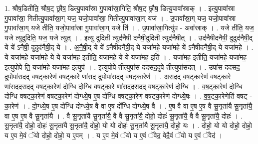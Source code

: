\documentclass[17pt]{extarticle}
\begin{document}
1. श्रौष॒डितीति॒ श्रौष॒ट् छ्रौष॒ डित्यु॒पावा᳚स्रा गु॒पावा᳚स्रा॒गिति॒ श्रौष॒ट् छ्रौष॒ डित्यु॒पावा᳚स्राक् । . इत्यु॒पावा᳚स्रा गु॒पावा᳚स्रा॒ गितीत्यु॒पावा᳚स्रा॒ग् यज॒ यजो॒पावा᳚स्रा॒ गितीत्यु॒पावा᳚स्रा॒ग् यज॑ । . उ॒पावा᳚स्रा॒ग् यज॒ यजो॒पावा᳚स्रा गु॒पावा᳚स्रा॒ग् यजे तीति॒ यजो॒पावा᳚स्रा गु॒पावा᳚स्रा॒ग् यजे ति॑ । . उ॒पावा᳚स्रा॒गित्यु॑प - अवा᳚स्राक् । . यजे तीति॒ यज॒ यजे त्युदुदिति॒ यज॒ यजे त्युत् । . इत्यु दुदिती त्युद॑नैषी दनैषी॒दुदिती त्युद॑नैषीत् । . उद॑नैषीदनैषी॒ दुदुद॑नैषी॒द् ये ये॑ ऽनैषी॒ दुदुद॑नैषी॒द् ये । . अ॒नै॒षी॒द् ये ये॑ ऽनैषीदनैषी॒द् ये यजा॑महे॒ यजा॑महे ये॑ ऽनैषीदनैषी॒द् ये यजा॑महे । . ये यजा॑महे॒ यजा॑महे॒ ये ये यजा॑मह॒ इतीति॒ यजा॑महे॒ ये ये यजा॑मह॒ इति॑ । . यजा॑मह॒ इतीति॒ यजा॑महे॒ यजा॑मह॒ इत्युपोपे ति॒ यजा॑महे॒ यजा॑मह॒ इत्युप॑ । . इत्युपोपे तीत्युपा॑स ददसद॒दुपे तीत्युपा॑सदत् । . उपा॑स ददसद॒ दुपोपा॑सदद् वषट्का॒रेण॑ वषट्का॒रे णा॑सद॒ दुपोपा॑सदद् वषट्का॒रेण॑ । . अ॒स॒द॒द् व॒ष॒ट्का॒रेण॑ वषट्का॒रे णा॑सददसदद् वषट्का॒रेण॑ दोग्धि दोग्धि वषट्का॒रे णा॑सददसदद् वषट्का॒रेण॑ दोग्धि । . व॒ष॒ट्का॒रेण॑ दोग्धि दोग्धि वषट्का॒रेण॑ वषट्का॒रेण॑ दोग्ध्ये॒ष ए॒ष दो᳚ग्धि वषट्का॒रेण॑ वषट्का॒रेण॑ दोग्ध्ये॒षः । . व॒ष॒ट्का॒रेणेति॑ वषट् - का॒रेण॑ । . दो॒ग्ध्ये॒ष ए॒ष दो᳚ग्धि दोग्ध्ये॒ष वै वा ए॒ष दो᳚ग्धि दोग्ध्ये॒ष वै । . ए॒ष वै वा ए॒ष ए॒ष वै सू॒नृता॑यै सू॒नृता॑यै॒ वा ए॒ष ए॒ष वै सू॒नृता॑यै । . वै सू॒नृता॑यै सू॒नृता॑यै॒ वै वै सू॒नृता॑यै॒ दोहो॒ दोहः॑ सू॒नृता॑यै॒ वै वै सू॒नृता॑यै॒ दोहः॑ । . सू॒नृता॑यै॒ दोहो॒ दोहः॑ सू॒नृता॑यै सू॒नृता॑यै॒ दोहो॒ यो यो दोहः॑ सू॒नृता॑यै सू॒नृता॑यै॒ दोहो॒ यः । . दोहो॒ यो यो दोहो॒ दोहो॒ य ए॒व मे॒वं ॅयो दोहो॒ दोहो॒ य ए॒वम् । . य ए॒व मे॒वं ॅयो य ए॒वं ॅवेद॒ वेदै॒वं ॅयो य ए॒वं ॅवेद॑ । \newline
\end{document}
